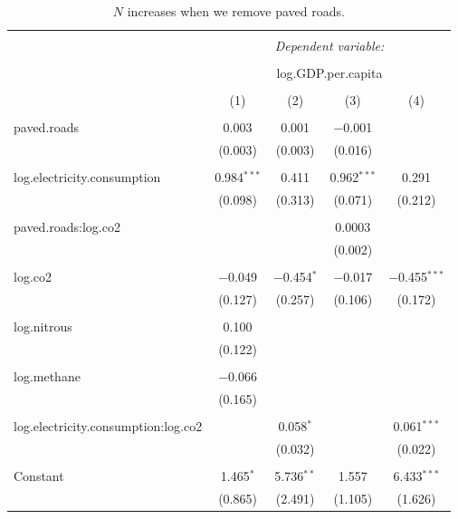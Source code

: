 \documentclass[11pt]{article}
\begin{document}
\begin{landscape}
\begin{table}[!htbp] \centering 
  \caption{$N$ increases when we remove paved roads.}
  \label{climate_model_regressions} 
\begin{tabular}{@{\extracolsep{5pt}}lcccc} 
\\[-1.8ex]\hline 
\hline \\[-1.8ex] 
 & \multicolumn{4}{c}{\textit{Dependent variable:}} \\ 
\cline{2-5} 
\\[-1.8ex] & \multicolumn{4}{c}{log.GDP.per.capita} \\ 
\\[-1.8ex] & (1) & (2) & (3) & (4)\\ 
\hline \\[-1.8ex] 
 paved.roads & 0.003 & 0.001 & $-$0.001 &  \\ 
  & (0.003) & (0.003) & (0.016) &  \\ 
  & & & & \\ 
 log.electricity.consumption & 0.984$^{***}$ & 0.411 & 0.962$^{***}$ & 0.291 \\ 
  & (0.098) & (0.313) & (0.071) & (0.212) \\ 
  & & & & \\ 
 paved.roads:log.co2 &  &  & 0.0003 &  \\ 
  &  &  & (0.002) &  \\ 
  & & & & \\ 
 log.co2 & $-$0.049 & $-$0.454$^{*}$ & $-$0.017 & $-$0.455$^{***}$ \\ 
  & (0.127) & (0.257) & (0.106) & (0.172) \\ 
  & & & & \\ 
 log.nitrous & 0.100 &  &  &  \\ 
  & (0.122) &  &  &  \\ 
  & & & & \\ 
 log.methane & $-$0.066 &  &  &  \\ 
  & (0.165) &  &  &  \\ 
  & & & & \\ 
 log.electricity.consumption:log.co2 &  & 0.058$^{*}$ &  & 0.061$^{***}$ \\ 
  &  & (0.032) &  & (0.022) \\ 
  & & & & \\ 
 Constant & 1.465$^{*}$ & 5.736$^{**}$ & 1.557 & 6.433$^{***}$ \\ 
  & (0.865) & (2.491) & (1.105) & (1.626) \\ 

\end{tabular}
\end{table}
\end{landscape}
\end{document}
